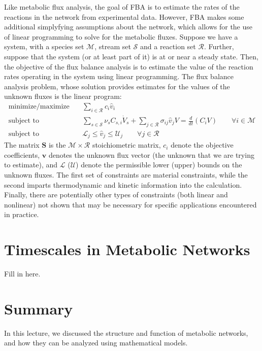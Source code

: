 \documentclass{article}[12pt]
\begin{document}
Like metabolic flux analysis, the goal of FBA is to estimate the rates of the reactions in the network from experimental data.
However, FBA makes some additional simplyfying assumptions about the network, which allows for the use of linear programming to solve for the metabolic fluxes.
Suppose we have a system, with a species set $\mathcal{M}$, stream set $\mathcal{S}$ and a reaction set $\mathcal{R}$. 
Further, suppose that the system (or at least part of it) is at or near a steady state. 
Then, the objective of the flux balance analysis is to estimate the value of the reaction rates operating in the system using linear programming.
The flux balance analysis problem, whose solution provides estimates for the values of the unknown fluxes is the linear program: 
\begin{eqnarray}
\text{minimize/maximize}~& & \sum_{i\in\mathcal{R}}c_{i}\hat{v}_{i}\\
\text{subject to} & & \sum_{s\in\mathcal{S}}\nu_{s}C_{s,i}\dot{V}_{s} + \sum_{j\in\mathcal{R}}\sigma_{ij}\hat{v}_{j}V = \frac{d}{dt}\left(C_{i}V\right)\qquad\forall{i\in\mathcal{M}}\\
\text{subject to} & & \mathcal{L}_{j}\leq\hat{v}_{j}\leq\mathcal{U}_{j}\qquad\forall{j\in\mathcal{R}}
\end{eqnarray}
The matrix $\mathbf{S}$ is the $\mathcal{M}\times\mathcal{R}$ stoichiometric matrix, $c_{i}$ denote the objective coefficients, 
$\mathbf{v}$ denotes the unknown flux vector (the unknown that we are trying to estimate), and 
$\mathcal{L}$ ($\mathcal{U}$) denote the permissible lower (upper) bounds on the unknown fluxes. 
The first set of constraints are material constraints, 
while the second imparts thermodynamic and kinetic information into the calculation. 
Finally, there are potentially other types of constraints (both linear and nonlinear) not shown 
that may be necessary for specific applications encountered in practice.

\section{Timescales in Metabolic Networks}
Fill in here.

\section{Summary}
In this lecture, we discussed the structure and function of metabolic networks, and how they can be analyzed using mathematical models.






\end{document}

